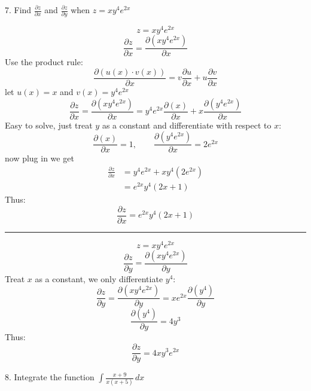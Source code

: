 \documentclass[a4paper, 12pt]{report}
\def\ni{green!60!black!40!white}
\begin{document}
    
    \newpage
    
    \begin{tcolorbox}[title={\color{black}\section{Q7}}, colback=white, colframe=\ni, boxrule=1mm, width=1\textwidth]
        7. Find \( \frac{\partial z}{\partial x} \) and \( \frac{\partial z}{\partial y} \) when \( z = x y^4 e^{2x} \)
    \end{tcolorbox}
    
    \[z = x y^4 e^{2x}\]
    \[\frac{\partial z}{\partial x} = \frac{\partial\left( x y^4 e^{2x} \right)}{\partial x} \]
    Use the product rule:
    \[\frac{\partial (u(x)\cdot v(x))}{\partial x} = v\frac{\partial u}{\partial x} + u\frac{\partial v}{\partial x}\]
    let $u(x) = x$ and $v(x)=y^4 e^{2x}$
    \[\frac{\partial z}{\partial x}=\frac{\partial\left( x y^4 e^{2x} \right)}{\partial x} = y^4 e^{2x} \frac{\partial (x)}{\partial x} + x \frac{\partial \left( y^4 e^{2x} \right)}{\partial x} \]
    Easy to solve, just treat \(y\) as a constant and differentiate with respect to \(x\):
    \[\frac{\partial (x)}{\partial x}=1, \qquad \frac{\partial \left( y^4 e^{2x} \right)}{\partial x} = 2e^{2x}\]
    now plug in we get
    \begin{align*}
        \frac{\partial z}{\partial x} &= y^4 e^{2x} + x y^4 \left(2e^{2x}\right)\\ 
        &= e^{2x}y^4(2x + 1)
    \end{align*}    
    Thus:
    \[\boxed{\frac{\partial z}{\partial x} = e^{2x}y^4(2x + 1)}\]
    \hrule
    \[z = x y^4 e^{2x}\]
    \[\frac{\partial z}{\partial y} = \frac{\partial \left( x y^4 e^{2x} \right)}{\partial y} \]
    Treat \(x\) as a constant, we only differentiate \( y^4 \):
    \[\frac{\partial z}{\partial y} = \frac{\partial \left( x y^4 e^{2x} \right)}{\partial y} = x e^{2x} \frac{\partial \left(y^4\right) }{\partial y}\]
    \[\frac{\partial \left(y^4\right) }{\partial y} = 4y^3\]    
    Thus:
    \[\boxed{\frac{\partial z}{\partial y} = 4x y^3 e^{2x}}\]
    
    \newpage
    
    \begin{tcolorbox}[title={\color{black}\section{Q8}}, colback=white, colframe=\ni, boxrule=1mm, width=1\textwidth]
        8. Integrate the function \( \int \frac{x + 9}{x(x + 5)} \, dx \)
    \end{tcolorbox}
    
\end{document}
